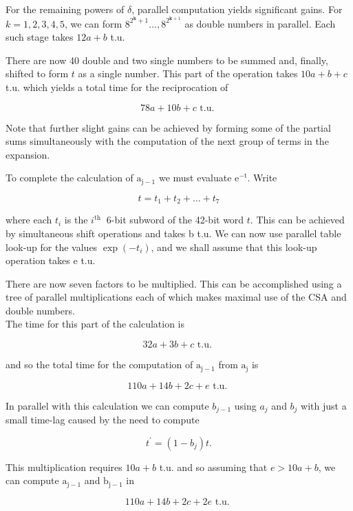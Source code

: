 \documentclass[10pt]{article}
\begin{document}
For the remaining powers of $\delta$, parallel computation yields significant gains. For $k= 1,2,3,4,5$, we can form $8^{2^{\mathbf{k}}+1} \ldots, 8^{2^{\mathbf{k}+1}}$ as double numbers in parallel. Each such stage takes $12 a+b$ t.u.

There are now 40 double and two single numbers to be summed and, finally, shifted to form $t$ as a single number. This part of the operation takes $10 a+b+c$ t.u. which yields a total time for the reciprocation of

$$
78 a+10 b+c \text { t.u. }
$$

Note that further slight gains can be achieved by forming some of the partial sums simultaneously with the computation of the next group of terms in the expansion.

To complete the calculation of $\mathrm{a}_{\mathrm{j}-1}$ we must evaluate $\mathrm{e}^{-\mathrm{t}}$. Write


\begin{equation*}
t=t_{1}+t_{2}+\ldots+t_{7} \tag{5.5.2}
\end{equation*}


where each $t_{i}$ is the $i^{\text {th }}$ 6-bit subword of the 42-bit word $t$. This can be achieved by simultaneous shift operations and takes b t.u. We can now use parallel table look-up for the values $\exp \left(-t_{i}\right)$, and we shall assume that this look-up operation takes e t.u.

There are now seven factors to be multiplied. This can be accomplished using a tree of parallel multiplications each of which makes maximal use of the CSA and double numbers.\\
The time for this part of the calculation is

$$
32 a+3 b+c \text { t.u. }
$$

and so the total time for the computation of $\mathrm{a}_{\mathrm{j}-1}$ from $\mathrm{a}_{\mathrm{j}}$ is

$$
110 a+14 b+2 c+e \text { t.u. }
$$

In parallel with this calculation we can compute $b_{j-1}$ using $a_{j}$ and $b_{j}$ with just a small time-lag caused by the need to compute

$$
t^{\prime}=\left(1-b_{j}\right) t .
$$

This multiplication requires $10 a+b$ t.u. and so assuming that $e>10 a+b$, we can compute $\mathrm{a}_{\mathrm{j}-1}$ and $\mathrm{b}_{\mathrm{j}-1}$ in

$$
110 a+14 b+2 c+2 e \text { t.u. }
$$
\end{document}
